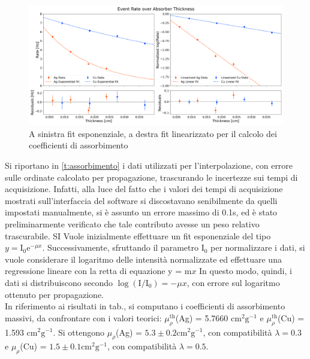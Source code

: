 \documentclass[twocolumn,10pt]{asme2ej}
\begin{document}
\begin{figure}[t]
    \centering
    \includegraphics[width=\textwidth]{../Plots/attenuation_coeff.png}
   \caption{A sinistra fit esponenziale, a destra fit linearizzato per il calcolo dei coefficienti di assorbimento}
    \label{i:attenuation}
\end{figure}

Si riportano in \autoref{t:assorbimento} i dati utilizzati per l'interpolazione, con errore sulle ordinate calcolato per 
propagazione, trascurando le incertezze sui tempi di acquisizione. Infatti, alla luce del fatto che i valori dei tempi di
acquisizione mostrati sull'interfaccia del software si discostavano senibilmente da quelli impostati manualmente, si è 
assunto un errore massimo di 0.1\si{\second}, ed è stato preliminarmente verificato che tale contributo avesse un peso 
relativo trascurabile. SI Vuole inizialmente effettuare un fit esponenziale del tipo $y = \text{I}_0 \text{e}^{-\mu x }$. 
Successivamente, sfruttando il parametro $\text{I}_0 $ per normalizzare i dati, si vuole considerare il logaritmo delle 
intensità normalizzate ed effettuare una regressione lineare con la retta  di equazione y = m$x$  In questo modo, quindi, 
i dati si distribuiscono secondo $\log(\text{I}/\text{I}_0)=-\mu x$, con errore sul logaritmo ottenuto per propagazione. \\
\indent In riferimento ai risultati in tab., si computano i coefficienti di assorbimento massivi, da confrontare con i valori 
teorici: $\mu_{\rho}^{\text{th}}$(Ag) = 5.7660 $\si{\centi\metre^2\gram^{-1}}$ e $\mu_{\rho}^{\text{th}}$(Cu) = 1.593 $\si{\centi\metre^2\gram^{-1}}$. 
Si ottengono $\mu_{\rho}$(Ag) = $5.3\pm 0.2 \si{\centi\metre^2\gram^{-1}}$, con compatibilità $\lambda = 0.3$ e
 $\mu_{\rho}$(Cu) = $1.5\pm 0.1 \si{\centi\metre^2\gram^{-1}}$, con compatibilità $\lambda = 0.5$. 
\end{document}
